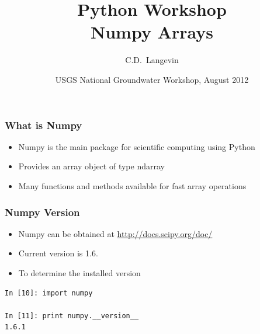 \documentclass{beamer}
\title[]{Python Workshop\\
Numpy Arrays}
\author[Langevin] %
{C.D.~Langevin}
\institute[USGS] %
{
  U.S. Geological Survey\\
  Reston, Virginia, USA
  }
\date[UQ12] %
{USGS National Groundwater Workshop, August 2012}
\begin{document}
\begin{frame}
  \titlepage
\end{frame}



\begin{frame}[fragile]
\frametitle{What is Numpy}
\begin{itemize}
  \item Numpy is the main package for scientific computing using Python
  \item Provides an array object of type ndarray
  \item Many functions and methods available for fast array operations
\end{itemize}
\end{frame}

\begin{frame}[fragile]
\frametitle{Numpy Version}
\begin{itemize}
  \item Numpy can be obtained at \url{http://docs.scipy.org/doc/}
  \item Current version is 1.6.
  \item To determine the installed version
\end{itemize}
  \begin{lstlisting}
In [10]: import numpy

In [11]: print numpy.__version__
1.6.1
  \end{lstlisting}
\end{frame}
\end{document}
